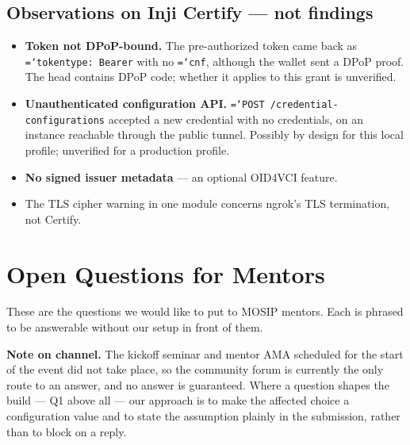 \documentclass[11pt,a4paper]{article}
\newcommand{\tightlist}{\setlength{\itemsep}{0pt}\setlength{\parskip}{0pt}\setlength{\parsep}{0pt}}
\let\origtexttt\texttt
\renewcommand{\texttt}[1]{\origtexttt{\hyphenchar\font=`\-\relax #1}}
\renewcommand{\_}{\textunderscore\allowbreak}
\begin{document}
\subsection*{Observations on Inji Certify --- not findings}
\begin{itemize}\tightlist
  \item \textbf{Token not DPoP-bound.} The pre-authorized token came back as
        \texttt{token\_type: Bearer} with no \texttt{cnf}, although the wallet sent a DPoP proof.
        The head contains DPoP code; whether it applies to this grant is unverified.
  \item \textbf{Unauthenticated configuration API.} \texttt{POST /credential-configurations} accepted
        a new credential with no credentials, on an instance reachable through the public
        tunnel. Possibly by design for this local profile; unverified for a production profile.
  \item \textbf{No signed issuer metadata} --- an optional OID4VCI feature.
  \item The TLS cipher warning in one module concerns ngrok's TLS termination, not Certify.
\end{itemize}

\newpage
\section{Open Questions for Mentors}

These are the questions we would like to put to MOSIP mentors. Each is phrased to be
answerable without our setup in front of them.

\textbf{Note on channel.} The kickoff seminar and mentor AMA scheduled for the start of the
event did not take place, so the community forum is currently the only route to an answer,
and no answer is guaranteed. Where a question shapes the build --- Q1 above all --- our
approach is to make the affected choice a configuration value and to state the assumption
plainly in the submission, rather than to block on a reply.
\end{document}
